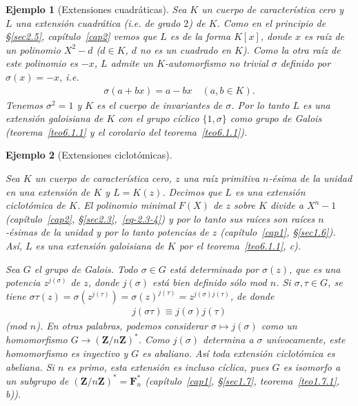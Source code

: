 \documentclass[10pt,oneside,bibtotoc,smallheadings,leqno,a5paper,DIV=12]{scrbook}
\newcommand{\ZZ}{\mathbf{Z}}
\newcommand{\FF}{\mathbf{F}}
\renewcommand{\to}[1][]{\xrightarrow{#1}}
\numberwithin{equation}{section}
\theoremstyle{defi}
\theoremstyle{enonce}
\theoremstyle{rem}
\newtheorem{example}{Ejemplo}
\numberwithin{theorem}{section}
\numberwithin{proposition}{section}
\numberwithin{definition}{section}
\numberwithin{lemma}{section}
\numberwithin{corollary}{section}
\numberwithin{example}{section}
\numberwithin{footnote}{section}%
\begin{document}
\begin{example}[Extensiones cuadr\'aticas]

Sea $K$ un cuerpo de caracter\'istica cero y $L$ una extensi\'on cuadr\'atica (i.e. de
grado $2$) de $K$.
Como en el principio de \S\ref{sec2.5}, cap\'itulo~\ref{cap2} vemos que $L$ es de la
forma $K[x]$, donde $x$ es
ra\'iz de un polinomio $X^{2}-d$ ($d\in K$, $d$ no es un cuadrado en $K$). Como la otra
ra\'iz de este polinomio
es $-x$, $L$ admite un $K$-automorfismo no trivial $\sigma$ definido por $\sigma(x) = -x$, i.e.
\begin{gather*}
\sigma(a+bx) = a-bx\quad(a,b\in K).
\end{gather*}
Tenemos $\sigma^{2}=1$ y $K$ es el cuerpo de invariantes de $\sigma$.
Por lo tanto $L$ es una extensi\'on
{\em galoisiana} de $K$ con el grupo {\em c\'iclico} $\{1,\sigma\}$ como grupo de
Galois (teorema~\ref{teo6.1.1} y el corolario del teorema~\ref{teo6.1.1}).
\end{example}

\begin{example}[Extensiones ciclot\'omicas]\label{ej6.1.2}

Sea $K$ un cuerpo de caracter\'istica cero, $z$ una ra\'iz primitiva $n$-\'esima de
la unidad en una
extensi\'on de $K$ y $L=K(z)$. Decimos que $L$ es una extensi\'on {\em ciclot\'omica}
de $K$. El polinomio
minimal $F(X)$ de $z$ sobre $K$ divide a $X^{n}-1$
(cap\'itulo~\ref{cap2}, \S\ref{sec2.3},~\eqref{eq-2.3-4}) y por lo tanto
sus ra\'ices son ra\'ices $n$-\'esimas de la unidad y por lo tanto potencias
de $z$ (cap\'itulo~\ref{cap1}, \S\ref{sec1.6}).
As\'i, $L$ es una extensi\'on {\em galoisiana} de $K$ por el
teorema~\ref{teo6.1.1}, {\itshape c}).

Sea $G$ el grupo de Galois. Todo $\sigma\in G$ est\'a determinado por $\sigma(z)$,
que es una potencia
$z^{j(\sigma)}$ de $z$, donde $j(\sigma)$ est\'a bien definido s\'olo mod $n$.
Si $\sigma,\tau\in G$, se tiene
$\sigma\tau(z) = \sigma(z^{j(\tau)}) = \sigma(z)^{j(\tau)} = z^{j(\sigma)j(\tau)}$, de donde
\begin{gather*}
j(\sigma\tau) \equiv j(\sigma)j(\tau)
\end{gather*}
(mod $n$). En otras palabras, podemos considerar $\sigma\mapsto j(\sigma)$ como
un {\em homomorfismo}
$G\to(\ZZ/n\ZZ)^{*}$. Como $j(\sigma)$ determina a $\sigma$ un\'ivocamente, este
homomorfismo es {\em inyectivo}
y $G$ es abaliano. As\'i {\em toda extensi\'on ciclot\'omica es abeliana.} Si $n$ es
primo, esta extensi\'on
es incluso {\em c\'iclica,} pues $G$ es isomorfo a un subgrupo de
$(\ZZ/n\ZZ)^{*} = \FF_{n}^{*}$ (cap\'itulo~\ref{cap1},
\S\ref{sec1.7}, teorema~\ref{teo1.7.1}, {\itshape b})).
\end{example}
\end{document}

